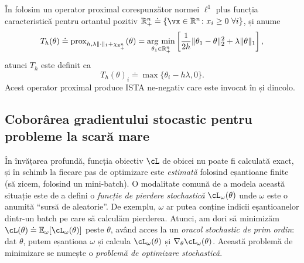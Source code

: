 \documentclass[../../book-main_ro.tex]{subfiles}
\begin{document}
\begin{example}\label{example:prox-of-nonnegative-l1}
    În  folosim un operator proximal corespunzător normei \(\ell^{1}\) plus funcția caracteristică pentru ortantul pozitiv \(\R_{+}^{n} \doteq \{\vx \in \R^{n} \colon x_{i} \geq 0\ \forall i\}\), și anume
    \begin{equation}
        T_{h}(\theta) \doteq \prox_{h, \lambda\norm{\cdot}_{1} + \chi_{\R_{+}^{n}}}(\theta) = \argmin_{\theta_{1} \in \R_{+}^{n}}\bs{\frac{1}{2h}\norm{\theta_{1} - \theta}_{2}^{2} + \lambda\norm{\theta}_{1}},
    \end{equation}
    atunci \(T_{h}\) este definit ca
    \begin{equation}
        T_{h}(\theta)_{i} \doteq \max\{\theta_{i} - h\lambda, 0\}.
    \end{equation}
    Acest operator proximal produce ISTA ne-negativ care este invocat în  și dincolo.
\end{example}



\subsection{Coborârea gradientului stocastic pentru probleme la scară mare}


În învățarea profundă, funcția obiectiv \(\cL\) de obicei nu poate fi calculată exact, și în schimb la fiecare pas de optimizare este \textit{estimată} folosind eșantioane finite (să zicem, folosind un mini-batch). O modalitate comună de a modela această situație este de a defini o \textit{funcție de pierdere stochastică} \(\cL_{\omega}(\theta)\) unde \(\omega\) este o anumită ``sursă de aleatorie''. De exemplu, \(\omega\) ar putea conține indicii eșantioanelor dintr-un batch pe care să calculăm pierderea. Atunci, am dori să minimizăm \(\cL(\theta) \doteq \Ex_{\omega}[\cL_{\omega}(\theta)]\) peste \(\theta\), având acces la un \textit{oracol stochastic de prim ordin}: dat \(\theta\), putem eșantiona \(\omega\) și calcula \(\cL_{\omega}(\theta)\) și \(\nabla_{\theta}\cL_{\omega}(\theta)\). Această problemă de minimizare se numește o \textit{problemă de optimizare stochastică}.
\end{document}
